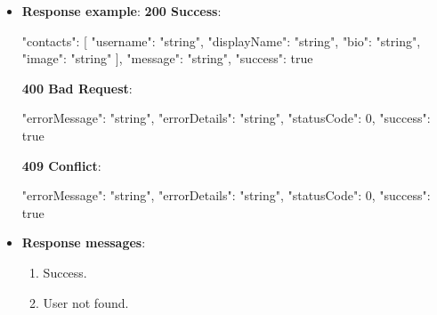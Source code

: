 \begin{itemize}
\begin{itemize}
        \item \textbf{Response example}:
        \textbf{200 Success}:
        \begin{spverbatim}
        {
            "contacts": [
                {
                "username": "string",
                "displayName": "string",
                "bio": "string",
                "image": "string"
            }
            ],
            "message": "string",
            "success": true
        }
        \end{spverbatim}
        \textbf{400 Bad Request}:
        \begin{spverbatim}
        {
            "errorMessage": "string",
            "errorDetails": "string",
            "statusCode": 0,
            "success": true
        }
        \end{spverbatim}
        \textbf{409 Conflict}:
        \begin{spverbatim}
        {
            "errorMessage": "string",
            "errorDetails": "string",
            "statusCode": 0,
            "success": true
        }
        \end{spverbatim}
        \item \textbf{Response messages}:
        \begin{enumerate}
            \item Success.
            \item User not found.
        \end{enumerate}
    \end{itemize}
\end{itemize}


